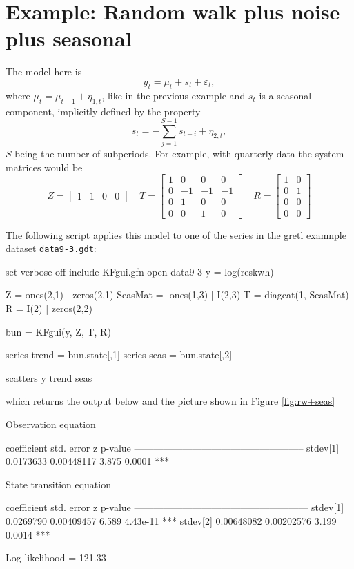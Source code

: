 \documentclass[a4paper]{article}
\begin{document}
\section*{Example: Random walk plus noise plus seasonal}

The model here is
\[
  y_t = \mu_t + s_t + \varepsilon_t,
\]
where $\mu_t = \mu_{t-1} + \eta_{1,t}$, like in the previous example
and $s_t$ is a seasonal component, implicitly defined by the property
\[
  s_t = -\sum_{j=1}^{S-1} s_{t-i} + \eta_{2,t},
\]
$S$ being the number of subperiods. For example, with quarterly data
the system matrices would be
\[
  Z = \begin{bmatrix}  1 & 1 & 0 & 0  \end{bmatrix}
  \quad
  T = \begin{bmatrix}
    1 & 0 & 0 & 0 \\
    0 & -1 & -1 & -1 \\
    0 & 1 & 0 & 0 \\
    0 & 0 & 1 & 0
  \end{bmatrix}
  \quad
  R = \begin{bmatrix}  1 & 0 \\ 0 & 1 \\ 0 & 0 \\ 0 & 0   \end{bmatrix}
\]

The following script applies this model to one of the series in the
gretl examnple dataset \texttt{data9-3.gdt}:

\begin{code}
set verbose off
include KFgui.gfn
open data9-3
y = log(reskwh)

Z = ones(2,1) | zeros(2,1)
SeasMat = -ones(1,3) | I(2,3)
T = diagcat(1, SeasMat)
R = I(2) | zeros(2,2)

bun = KFgui(y, Z, T, R)

series trend = bun.state[,1]
series seas = bun.state[,2]

scatters y trend seas
\end{code}

which returns the output below and the picture shown in Figure
\ref{fig:rw+seas}

\begin{code}

Observation equation

             coefficient   std. error     z     p-value
  -----------------------------------------------------
  stdev[1]    0.0173633    0.00448117   3.875   0.0001  ***


State transition equation

             coefficient   std. error     z     p-value 
  ------------------------------------------------------
  stdev[1]   0.0269790     0.00409457   6.589   4.43e-11 ***
  stdev[2]   0.00648082    0.00202576   3.199   0.0014   ***

  Log-likelihood = 121.33
\end{code}
\end{document}
